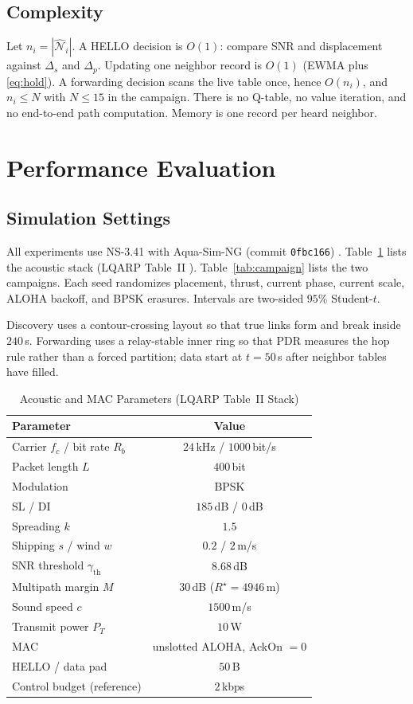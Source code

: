 \documentclass[journal]{IEEEtran}
\begin{document}
\subsection{Complexity}
Let $n_i=|\widehat{\mathcal{N}}_i|$. A HELLO decision is $O(1)$:
compare SNR and displacement against $\Delta_s$ and $\Delta_p$.
Updating one neighbor record is $O(1)$ (EWMA plus \eqref{eq:hold}).
A forwarding decision scans the live table once, hence $O(n_i)$,
and $n_i\le N$ with $N\le 15$ in the campaign. There is no Q-table,
no value iteration, and no end-to-end path computation. Memory is
one record per heard neighbor.

\section{Performance Evaluation}
\label{sec:eval}

\subsection{Simulation Settings}
All experiments use NS-3.41 with Aqua-Sim-NG (commit \texttt{0fbc166})
\cite{ns3manual,aquasimng}.
Table~\ref{tab:params} lists the acoustic stack (LQARP Table~II
\cite{liu2026lqarp}). Table~\ref{tab:campaign} lists the two
campaigns. Each seed randomizes placement, thrust, current phase,
current scale, ALOHA backoff, and BPSK erasures. Intervals are
two-sided $95\%$ Student-$t$.

Discovery uses a contour-crossing layout so that true links form and
break inside $240$\,s. Forwarding uses a relay-stable inner ring so
that PDR measures the hop rule rather than a forced partition; data
start at $t=50$\,s after neighbor tables have filled.

\begin{table}[!t]
\caption{Acoustic and MAC Parameters (LQARP Table~II Stack)}
\label{tab:params}
\centering
\begin{tabular}{lc}
\toprule
Parameter & Value \\
\midrule
Carrier $f_{c}$ / bit rate $R_b$ & $24$\,kHz / $1000$\,bit/s \\
Packet length $L$ & $400$\,bit \\
Modulation & BPSK \\
SL / DI & $185$\,dB / $0$\,dB \\
Spreading $k$ & $1.5$ \\
Shipping $s$ / wind $w$ & $0.2$ / $2$\,m/s \\
SNR threshold $\gamma_{\mathrm{th}}$ & $8.68$\,dB \\
Multipath margin $M$ & $30$\,dB ($R^{\star}=4946$\,m) \\
Sound speed $c$ & $1500$\,m/s \\
Transmit power $P_T$ & $10$\,W \\
MAC & unslotted ALOHA, AckOn $=0$ \\
HELLO / data pad & $50$\,B \\
Control budget (reference) & $2$\,kbps \\
\bottomrule
\end{tabular}
\end{table}
\end{document}

